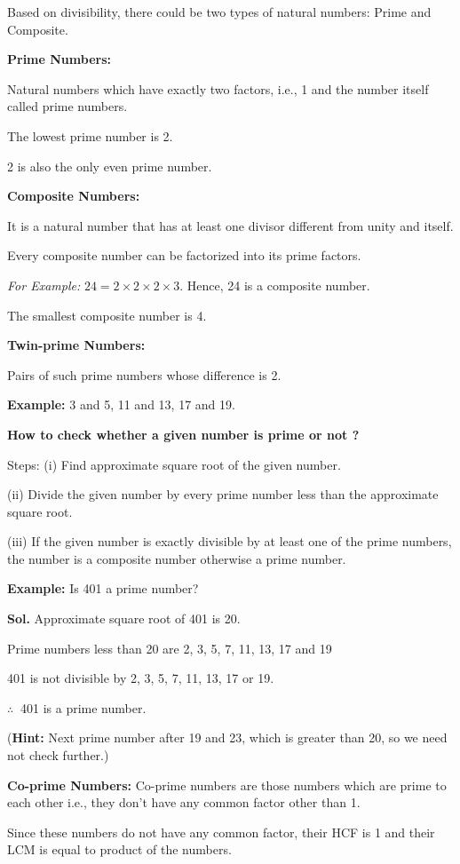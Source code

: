 \begin{multicols}{2}
Based on divisibility, there could be two types of natural numbers: Prime and Composite.

\textbf{Prime Numbers:}

Natural numbers which have exactly two factors, i.e., 1 and the number itself called prime numbers.

The lowest prime number is 2.

2 is also the only even prime number.

\textbf{Composite Numbers:}

It is a natural number that has at least one divisor different from unity and itself.

Every composite number can be factorized into its prime factors.

\textit{For Example:} $24 = 2 \times 2 \times 2 \times 3$. Hence, 24 is a composite number.

The smallest composite number is 4.

\textbf{Twin-prime Numbers:}

Pairs of such prime numbers whose difference is 2.

\textbf{Example:} 3 and 5, 11 and 13, 17 and 19.

\textbf{How to check whether a given number is prime or not ?}

Steps: (i) Find approximate square root of the given number.

(ii) Divide the given number by every prime number less than the approximate square root.

(iii) If the given number is exactly divisible by at least one of the prime numbers, the number is a composite number otherwise a prime number.

\textbf{Example:} Is 401 a prime number?

\textbf{Sol.} Approximate square root of 401 is 20.

Prime numbers less than 20 are 2, 3, 5, 7, 11, 13, 17 and 19

401 is not divisible by 2, 3, 5, 7, 11, 13, 17 or 19.

$\therefore~$ 401 is a prime number.

(\textbf{Hint:} Next prime number after 19 and 23, which is greater than 20, so we need not check further.)

\textbf{Co-prime Numbers:} Co-prime numbers are those numbers which are prime to each other i.e., they don't have any common factor other than 1.

Since these numbers do not have any common factor, their HCF is 1 and their LCM is equal to product of the numbers.


\end{multicols}
